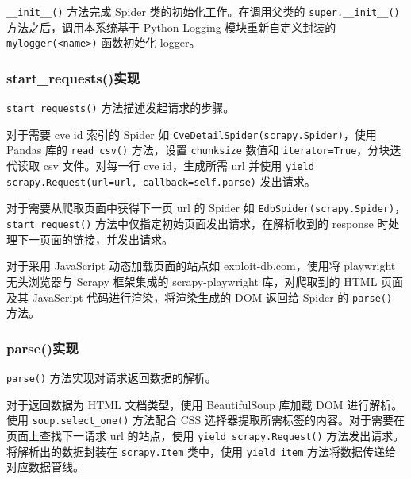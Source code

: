 \documentclass[a4paper,AutoFakeBold,oneside,12pt]{book}
\begin{document}
\lstinline[style = python]|__init__()| 方法完成 Spider 类的初始化工作。在调用父类的 \lstinline|super.__init__()| 方法之后，调用本系统基于 Python Logging 模块重新自定义封装的 \lstinline[style = python]|mylogger(<name>)| 函数初始化 logger。

\subsubsection{start{\_}requests()实现}
\lstinline[style = python]|start_requests()| 方法描述发起请求的步骤。

对于需要 cve id 索引的 Spider 如 \lstinline[style = python]|CveDetailSpider(scrapy.Spider)|，使用 Pandas 库的 \lstinline[style = python]|read_csv()| 方法，设置 \verb|chunksize| 数值和 \verb|iterator=True|，分块迭代读取 csv 文件。对每一行 cve id，生成所需 url 并使用 \lstinline[style = python]|yield scrapy.Request(url=url, callback=self.parse)| 发出请求。

对于需要从爬取页面中获得下一页 url 的 Spider 如 \lstinline[style = python]|EdbSpider(scrapy.Spider)|，\linebreak \lstinline[style = python]|start_request()| 方法中仅指定初始页面发出请求，在解析收到的 response 时处理下一页面的链接，并发出请求。

对于采用 JavaScript 动态加载页面的站点如 exploit-db.com，使用将 playwright 无头浏览器与 Scrapy 框架集成的 scrapy-playwright 库，对爬取到的 HTML 页面及其 JavaScript 代码进行渲染，将渲染生成的 DOM 返回给 Spider 的 \lstinline[style = python]|parse()| 方法。

\subsubsection{parse()实现}

\lstinline[style = python]|parse()| 方法实现对请求返回数据的解析。

对于返回数据为 HTML 文档类型，使用 BeautifulSoup 库加载 DOM 进行解析。使用 \lstinline[style = python]|soup.select_one()| 方法配合 CSS 选择器提取所需标签的内容。对于需要在页面上查找下一请求 url 的站点，使用 \lstinline[style = python]|yield scrapy.Request()| 方法发出请求。将解析出的数据封装在 \lstinline[style = python]|scrapy.Item| 类中，使用 \lstinline[style = python]|yield item| 方法将数据传递给对应数据管线。
\end{document}
